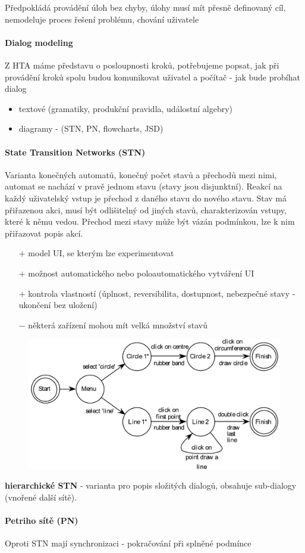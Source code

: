 Předpokládá provádění úloh bez chyby, úlohy musí mít přesně definovaný cíl, nemodeluje proces řešení problému, chování uživatele

\paragraph{Dialog modeling}
Z HTA máme představu o posloupnosti kroků, potřebujeme popsat, jak při provádění kroků spolu budou komunikovat uživatel a počítač - jak bude probíhat dialog
\begin{itemize}[itemsep=0px]
\item textové (gramatiky, produkční pravidla, událostní algebry)
\item diagramy - (STN, PN, flowcharts, JSD)
\end{itemize}

\paragraph{State Transition Networks (STN)}
Varianta konečných automatů, konečný počet stavů a přechodů mezi nimi, automat se nachází v pravě jednom stavu (stavy jsou disjunktní). Reakcí na každý uživatelský vstup je přechod z daného stavu do nového stavu. Stav má přiřazenou akci, musí být odlišitelný od jiných stavů, charakterizován vstupy, které k němu vedou. Přechod mezi stavy může být vázán podmínkou, lze k nim přiřazovat popis akcí.
\begin{itemize}[itemsep=0px]
\item[$+$] model UI, se kterým lze experimentovat
\item[$+$] možnost automatického nebo poloautomatického vytváření UI
\item[$+$] kontrola vlastností (úplnost, reversibilita, dostupnost, nebezpečné stavy - ukončení bez uložení)
\item[$-$] některá zařízení mohou mít velká množství stavů
\end{itemize}

\begin{figure}[h]
\centering
\includegraphics[width=130mm]{05/images/stn}
\end{figure}

\textbf{hierarchické STN} - varianta pro popis složitých dialogů, obsahuje sub-dialogy (vnořené další sítě).

\paragraph{Petriho sítě (PN)} Oproti STN mají synchronizaci - pokračování při splněné podmínce